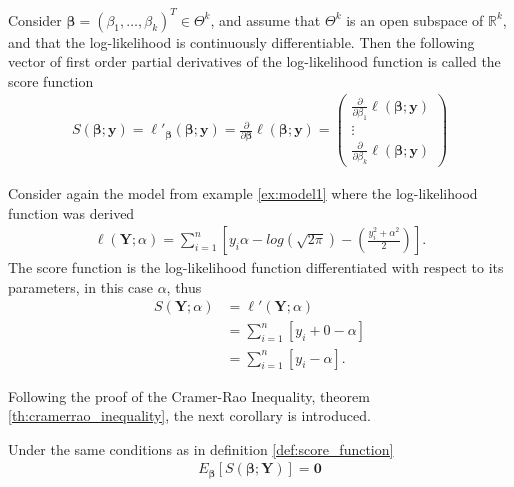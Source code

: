 \begin{definition}
\label{def:score_function}
Consider $\boldsymbol{\beta} = (\beta_1, \ldots, \beta_k)^T \in \Theta^k$, and assume that $\Theta^k$ is an open subspace of $\mathbb{R}^k$, and that the log-likelihood is continuously differentiable. Then the following vector of first order partial derivatives of the log-likelihood function is called the score function
\begin{align*}
    S(\boldsymbol{\beta}; \textbf{y}) = \ell'_{\boldsymbol{\beta}}(\boldsymbol{\beta}; \textbf{y}) = \frac{\partial}{\partial \boldsymbol{\beta}} \ell (\boldsymbol{\beta}; \textbf{y}) = 
    \begin{pmatrix}
        \frac{\partial}{\partial \beta_1}\ell (\boldsymbol{\beta}; \textbf{y}) \\
        \vdots \\
        \frac{\partial}{\partial \beta_k}\ell (\boldsymbol{\beta}; \textbf{y})
    \end{pmatrix}
\end{align*}
\end{definition}
\begin{example}
Consider again the model from example \ref{ex:model1} where the log-likelihood function was derived
\begin{align*}
   \ell(\textbf{Y};\alpha) = \sum_{i = 1}^n \left[y_i \alpha - log\left( \sqrt{2 \pi}\right) - \left( \frac{y_i^2 + \alpha^2}{2} \right) \right].
\end{align*}
The score function is the log-likelihood function differentiated with respect to its parameters, in this case $\alpha$, thus
\begin{align*}
    S\left( \textbf{Y}; \alpha \right) &= \ell'(\textbf{Y}; \alpha)\\
    &= \sum_{i=1}^n \left[ y_i + 0 - \alpha \right]\\
    &= \sum_{i=1}^n \left[ y_i - \alpha \right].
\end{align*}
\end{example}
Following the proof of the Cramer-Rao Inequality, theorem \ref{th:cramerrao_inequality}, the next corollary is introduced.
\begin{corollary}
Under the same conditions as in definition \ref{def:score_function}
\begin{align} \label{eq:corollary}
    E_{\boldsymbol{\beta}}[S(\boldsymbol{\beta}; \textbf{Y})] = \textbf{0}
\end{align}
\end{corollary}
